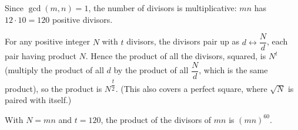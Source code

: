 Since $\gcd(m,n)=1$, the number of divisors is multiplicative: $mn$ has $12\cdot10=120$ positive divisors.

For any positive integer $N$ with $t$ divisors, the divisors pair up as $d\leftrightarrow\dfrac {N}{d}$, each pair having product $N$. Hence the product of all the divisors, squared, is $N^t$ (multiply the product of all $d$ by the product of all $\dfrac {N}{d}$, which is the same product), so the product is $N^{\dfrac {t}{2}}$. (This also covers a perfect square, where $\sqrt N$ is paired with itself.)

With $N=mn$ and $t=120$, the product of the divisors of $mn$ is $\boxed{(mn)^{60}}$.
